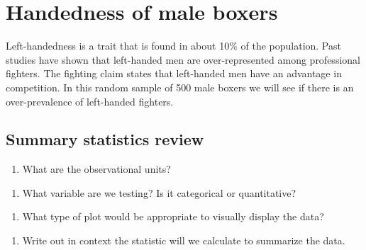 \documentclass[
]{report}
\providecommand{\tightlist}{%
  \setlength{\itemsep}{0pt}\setlength{\parskip}{0pt}}
\begin{document}
\hypertarget{handedness-of-male-boxers-1}{%
\section{Handedness of male boxers}\label{handedness-of-male-boxers-1}}

Left-handedness is a trait that is found in about 10\% of the population. Past studies have shown that left-handed men are over-represented among professional fighters. The fighting claim states that left-handed men have an advantage in competition. In this random sample of 500 male boxers we will see if there is an over-prevalence of left-handed fighters.

\hypertarget{summary-statistics-review}{%
\subsection*{Summary statistics review}\label{summary-statistics-review}}

\begin{enumerate}
\def\labelenumi{\arabic{enumi}.}
\tightlist
\item
  What are the observational units?
\end{enumerate}

\vspace{0.5in}

\begin{enumerate}
\def\labelenumi{\arabic{enumi}.}
\setcounter{enumi}{1}
\tightlist
\item
  What variable are we testing? Is it categorical or quantitative?
\end{enumerate}

\vspace{0.5in}

\begin{enumerate}
\def\labelenumi{\arabic{enumi}.}
\setcounter{enumi}{2}
\tightlist
\item
  What type of plot would be appropriate to visually display the data?
\end{enumerate}

\vspace{0.5in}

\begin{enumerate}
\def\labelenumi{\arabic{enumi}.}
\setcounter{enumi}{3}
\tightlist
\item
  Write out in context the statistic will we calculate to summarize the data.
\end{enumerate}
\end{document}
